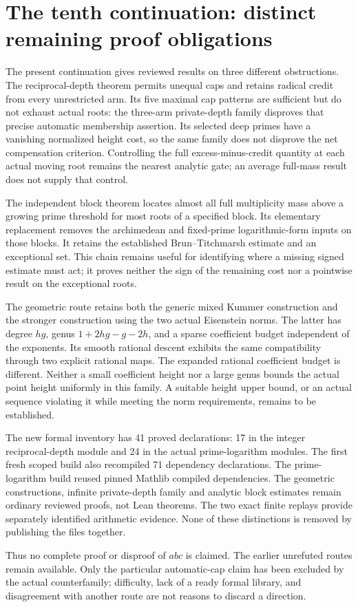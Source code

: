 \section{The tenth continuation: distinct remaining proof obligations}
\label{depth-status-section}

The present continuation gives reviewed results on three different
obstructions. The reciprocal-depth theorem permits unequal caps and
retains radical credit from every unrestricted arm. Its five maximal
cap patterns are sufficient but do not exhaust actual roots: the
three-arm private-depth family disproves that precise automatic
membership assertion. Its selected deep primes have a vanishing
normalized height cost, so the same family does not disprove the net
compensation criterion. Controlling the full excess-minus-credit
quantity at each actual moving root remains the nearest analytic
gate; an average full-mass result does not supply that control.

The independent block theorem locates almost all full multiplicity
mass above a growing prime threshold for most roots of a specified
block. Its elementary replacement removes the archimedean and
fixed-prime logarithmic-form inputs on those blocks. It retains the
established Brun--Titchmarsh estimate and an exceptional set. This
chain remains useful for identifying where a missing signed estimate
must act; it proves neither the sign of the remaining cost nor a
pointwise result on the exceptional roots.

The geometric route retains both the generic mixed Kummer construction
and the stronger construction using the two actual Eisenstein norms.
The latter has degree $hg$, genus $1+2hg-g-2h$, and a sparse coefficient
budget independent of the exponents. Its smooth rational descent
exhibits the same compatibility through two explicit rational maps.
The expanded rational coefficient budget is different. Neither a
small coefficient height nor a large genus bounds the actual point
height uniformly in this family. A suitable height upper bound, or
an actual sequence violating it while meeting the norm requirements,
remains to be established.

The new formal inventory has 41 proved declarations: 17 in the
integer reciprocal-depth module and 24 in the actual prime-logarithm
modules. The first fresh scoped build also recompiled 71 dependency
declarations. The prime-logarithm build reused pinned Mathlib compiled
dependencies. The geometric constructions, infinite private-depth
family and analytic block estimates remain ordinary reviewed proofs,
not Lean theorems. The two exact finite replays provide separately
identified arithmetic evidence. None of these distinctions is
removed by publishing the files together.

Thus no complete proof or disproof of $abc$ is claimed. The earlier
unrefuted routes remain available. Only the particular automatic-cap
claim has been excluded by the actual counterfamily; difficulty,
lack of a ready formal library, and disagreement with another route
are not reasons to discard a direction.

